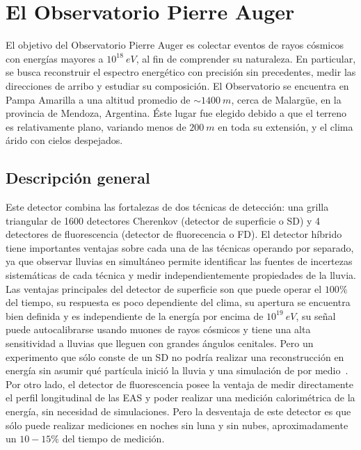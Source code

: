 \chapter{El Observatorio Pierre Auger}
\label{ch:detectorAuger}

El objetivo del Observatorio Pierre Auger es colectar eventos de rayos c\'osmicos con energ\'ias mayores a $10^{18}\ eV$, al fin de comprender su naturaleza. En particular, se busca reconstruir el espectro energ\'etico con precisi\'on sin precedentes, medir las direcciones de arribo y estudiar su composici\'on. El Observatorio se encuentra en Pampa Amarilla a una altitud promedio de $\sim 1400\ m$, cerca de Malarg\"ue, en la provincia de Mendoza, Argentina.
\'Este lugar fue elegido debido a que el terreno es relativamente plano, variando menos de $200\ m$ en toda su extensi\'on, y el clima \'arido con cielos despejados. 

	\section{Descripción general}
	Este detector combina las fortalezas de dos t\'ecnicas de detecci\'on: una grilla triangular de 1600 detectores Cherenkov (detector de superficie o SD) y 4 detectores de fluorescencia (detector de fluorecencia o FD).
	El detector h\'ibrido tiene importantes ventajas sobre cada una de las t\'ecnicas operando por separado, ya que observar lluvias en simult\'aneo permite identificar las fuentes de incertezas sistem\'aticas de cada t\'ecnica y medir independientemente propiedades de la lluvia.
	Las ventajas principales del detector de superficie son que puede operar el $100 \%$ del tiempo, su respuesta es poco dependiente del clima, su apertura se encuentra bien definida y es independiente de la energ\'ia por encima de $10^{19}\ eV$, su se\~nal puede autocalibrarse usando muones de rayos c\'osmicos  y tiene una alta sensitividad a lluvias que lleguen con grandes \'angulos cenitales. 
	Pero un experimento que s\'olo conste de un SD no podr\'ia realizar una reconstrucci\'on en energ\'ia sin asumir qu\'e part\'icula inici\'o la lluvia y una simulaci\'on de por medio~\cite{busca_thesis}.
	Por otro lado, el detector de fluorescencia posee la ventaja de medir directamente el perfil longitudinal de las EAS y poder realizar una medici\'on calorim\'etrica de la energ\'ia, sin necesidad de simulaciones. Pero la desventaja de este detector es que s\'olo puede realizar mediciones en noches sin luna y sin nubes, aproximadamente un $10 - 15 \%$ del tiempo de medici\'on.
	
